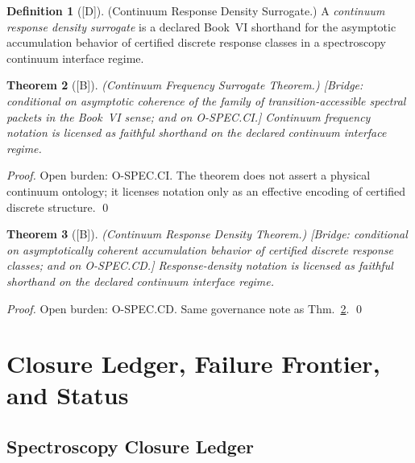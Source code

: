 \documentclass[12pt,oneside]{amsbook}
\theoremstyle{plain}
\newtheorem{theorem}{Theorem}[section]
\theoremstyle{definition}
\newtheorem{definition}[theorem]{Definition}
\theoremstyle{remark}
\newcommand{\status}[1]{\textup{[#1]}}
\begin{document}
\begin{definition}[\status{D}]\label{def:continuum-response-density-surrogate}
\textup{(Continuum Response Density Surrogate.)}
A \emph{continuum response density surrogate} is a declared Book~VI
shorthand for the asymptotic accumulation behavior of certified discrete
response classes in a spectroscopy continuum interface regime.
\end{definition}

\begin{theorem}[\status{B}]\label{thm:continuum-frequency-surrogate}
\textup{(Continuum Frequency Surrogate Theorem.)}
\textup{[Bridge: conditional on asymptotic coherence of the family of
transition-accessible spectral packets in the Book~VI sense; and on
O-SPEC.CI.]}
Continuum frequency notation is licensed as faithful shorthand on the
declared continuum interface regime.
\end{theorem}

\begin{proof}
Open burden: \textup{O-SPEC.CI}. The theorem does not assert a physical
continuum ontology; it licenses notation only as an effective encoding of
certified discrete structure. \qed
\end{proof}

\begin{theorem}[\status{B}]\label{thm:continuum-response-density}
\textup{(Continuum Response Density Theorem.)}
\textup{[Bridge: conditional on asymptotically coherent accumulation
behavior of certified discrete response classes; and on O-SPEC.CD.]}
Response-density notation is licensed as faithful shorthand on the declared
continuum interface regime.
\end{theorem}

\begin{proof}
Open burden: \textup{O-SPEC.CD}. Same governance note as
Thm.~\ref{thm:continuum-frequency-surrogate}. \qed
\end{proof}

\section{Closure Ledger, Failure Frontier, and Status}
\label{sec:spec-closure}

\subsection{Spectroscopy Closure Ledger}\label{sec:spec-ledger}
\end{document}
